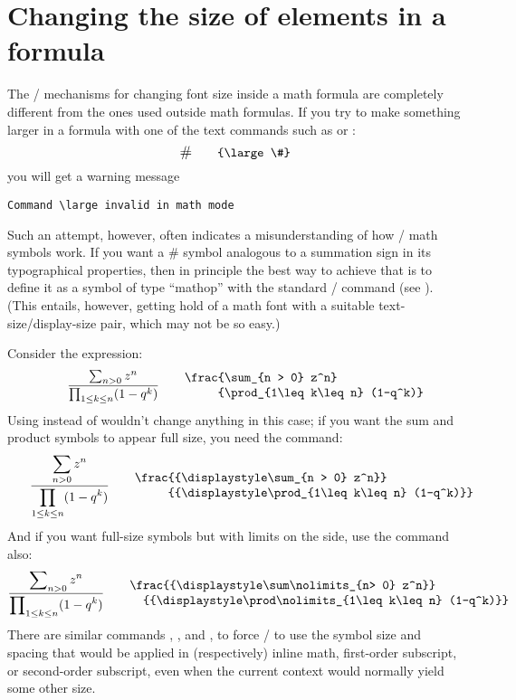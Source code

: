 
\section{Changing the size of elements in a formula}

The \lat/ mechanisms for changing font size inside a math formula are
completely different from the ones used outside math formulas. If you
try to make something larger in a formula with one of the text commands
such as  or :
\[\text{\large \#}\qquad\verb'{\large \#}'\]
you will get a warning message
\begin{verbatim}
Command \large invalid in math mode
\end{verbatim}
Such an attempt, however, often indicates a misunderstanding of how
\lat/ math symbols work. If you want a \# symbol analogous to a
summation sign in its typographical properties, then in principle the
best way to achieve that is to define it as a symbol of type ``mathop''
with the standard \lat/  command (see
\cite{fntguide}). (This entails, however, getting hold of a math font
with a suitable text-size\slash display-size pair, which may not be so
easy.)

Consider the expression:
\[\frac{\sum_{n > 0} z^n}{\prod_{1\leq k\leq n} (1-q^k)}
\qquad\begin{minipage}{.5\columnwidth}
\begin{verbatim}
\frac{\sum_{n > 0} z^n}
     {\prod_{1\leq k\leq n} (1-q^k)}
\end{verbatim}
\end{minipage}
\]
Using  instead of  wouldn't change anything in this
case; if you want the sum and product symbols to appear full size, you
need the  command:
\[
\frac{{\displaystyle\sum_{n > 0} z^n}}
     {{\displaystyle\prod_{1\leq k\leq n} (1-q^k)}}
\qquad\begin{minipage}{.7\columnwidth}
\begin{verbatim}
\frac{{\displaystyle\sum_{n > 0} z^n}}
     {{\displaystyle\prod_{1\leq k\leq n} (1-q^k)}}
\end{verbatim}
\end{minipage}
\]
And if you want full-size symbols but with limits on the side, use
the  command also:
\[
\frac{{\displaystyle\sum\nolimits_{n> 0} z^n}}
  {{\displaystyle\prod\nolimits_{1\leq k\leq n} (1-q^k)}}
\qquad\begin{minipage}{.76\columnwidth}
\begin{verbatim}
\frac{{\displaystyle\sum\nolimits_{n> 0} z^n}}
  {{\displaystyle\prod\nolimits_{1\leq k\leq n} (1-q^k)}}
\end{verbatim}
\end{minipage}
\]
There are similar commands , , and
, to force \lat/ to use the symbol size and
spacing that would be applied in (respectively) inline math, first-order
subscript, or second-order subscript, even when the current context
would normally yield some other size.

